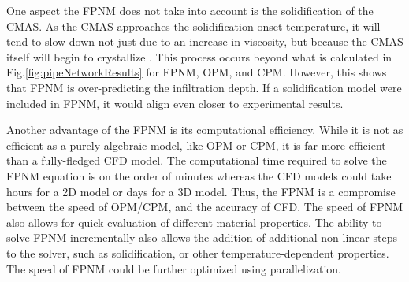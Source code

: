\documentclass[%
 aip,
 amsmath,amssymb,
 reprint,%
]{revtex4-1}
\begin{document}
One aspect the FPNM does not take into account is the solidification of the CMAS. As the CMAS approaches the solidification onset temperature, it will tend to slow down not just due to an increase in viscosity, but because the CMAS itself will begin to crystallize \cite{Naraparaju2019}. This process occurs beyond what is calculated in Fig.\ref{fig:pipeNetworkResults} for FPNM, OPM, and CPM. However, this shows that FPNM is over-predicting the infiltration depth. If a solidification model were included in FPNM, it would align even closer to experimental results.

Another advantage of the FPNM is its computational efficiency. While it is not as efficient as a purely algebraic model, like OPM or CPM, it is far more efficient than a fully-fledged CFD model. The computational time required to solve the FPNM equation is on the order of minutes whereas the CFD models could take hours for a 2D model or days for a 3D model. Thus, the FPNM is a compromise between the speed of OPM/CPM, and the accuracy of CFD. The speed of FPNM also allows for quick evaluation of different material properties. The ability to solve FPNM incrementally also allows the addition of additional non-linear steps to the solver, such as solidification, or other temperature-dependent properties. The speed of FPNM could be further optimized using parallelization. 



\end{document}
